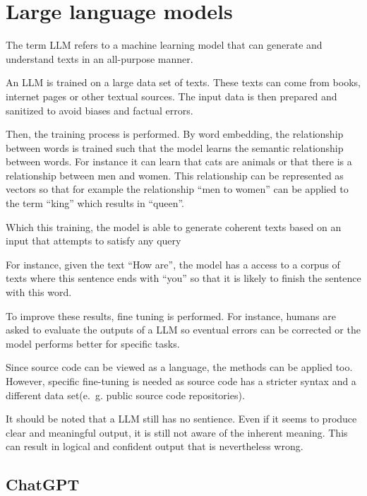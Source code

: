 \section{Large language models}\label{sec:llm}

The term \ac{LLM} refers to a machine learning model that can generate and understand texts in an all-purpose manner. 

An \ac{LLM} is trained on a large data set of texts. These texts can come from books, internet pages or other textual sources. The input data is then prepared and sanitized to avoid biases and factual errors.


Then, the training process is performed. By word embedding, the relationship between words is trained such that the model learns the semantic relationship between words. For instance it can learn that cats are animals  or that there is a relationship between men and women. This relationship can be represented as vectors so that for example the relationship \enquote{men to women} can be applied to the term \enquote{king} which results in \enquote{queen}.

Which this training, the model is able to generate coherent texts based on an input that attempts to satisfy any query


For instance, given the text \enquote{How are}, the model  has a access to a corpus of texts where this sentence ends with \enquote{you} so that it is likely to finish the sentence with this word. 

To improve these results, fine tuning is performed. For instance, humans are asked to evaluate the outputs of a \ac{LLM} so eventual errors can be corrected or the model performs better for specific tasks.



Since source code can be viewed as a language, the methods can be applied too. However, specific fine-tuning is needed as source code  has a stricter syntax and a different data set(e.~g. public source code repositories).

It should be noted that a \ac{LLM} still has no sentience. Even if it seems to produce clear and meaningful output, it is still not aware of the inherent meaning. This can result in logical and confident output that is nevertheless wrong. \cite{Amaratunga2023}

\subsection{ChatGPT}
\label{sec:chatgpt}


